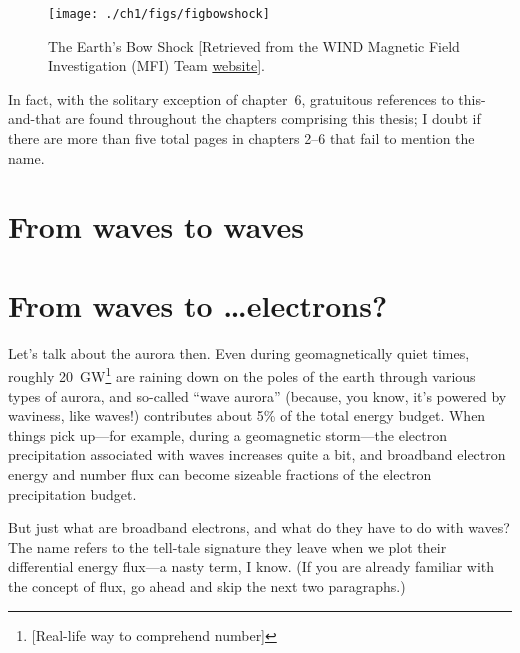 
  \begin{figure}
    \centering
    \noindent\texttt{[image: ./ch1/figs/figbowshock]}
    \caption[The Earth's Bow Shock]{The Earth's Bow Shock [Retrieved
      from the WIND Magnetic Field Investigation (MFI) Team
      \href{https://wind.nasa.gov/mfi/team_sciencea.html}{website}].}
    \label{ch1:FigBowShock}
  \end{figure}


  In fact, with the solitary exception of chapter~6, gratuitous
  references to \Alf this-and-that are found throughout the chapters
  comprising this thesis; I doubt if there are more than five total
  pages in chapters 2--6 that fail to mention the name.


\section{From waves to waves}



\section{From waves to \dots  electrons?}

Let's talk about the aurora then. Even during geomagnetically quiet
times, roughly 20~GW\footnote{[Real-life way to comprehend number]}
\citep{Newell2009} are raining down on the poles of the earth through
various types of aurora, and so-called ``wave aurora'' (because, you
know, it's powered by waviness, like \Alf waves!) contributes about
5\% of the total energy budget. When things pick up---for example,
during a geomagnetic storm---the electron precipitation associated with
\Alf waves increases quite a bit, and broadband electron energy and
number flux can become sizeable fractions of the electron
precipitation budget.

But just what are broadband electrons, and what do they have to do
with \Alf waves? The name refers to the tell-tale signature they leave
when we plot their differential energy flux---a nasty term, I
know. (If you are already familiar with the concept of flux, go ahead
and skip the next two paragraphs.) 

